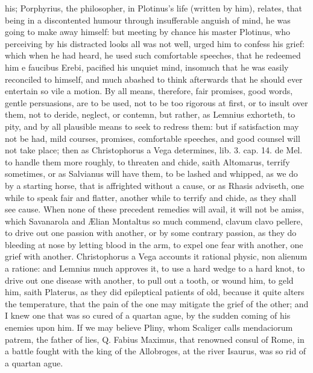 {his; Porphyrius, the philosopher, in Plotinus's life (written by him),
relates, that being in a discontented humour through insufferable
anguish of mind, he was going to make away himself: but meeting by
chance his master Plotinus, who perceiving by his distracted looks all
was not well, urged him to confess his grief: which when he had heard,
he used such comfortable speeches, that he redeemed him e faucibus
Erebi, pacified his unquiet mind, insomuch that he was easily
reconciled to himself, and much abashed to think afterwards that he
should ever entertain so vile a motion. By all means, therefore, fair
promises, good words, gentle persuasions, are to be used, not to be too
rigorous at first, or to insult over them, not to deride,
neglect, or contemn, but rather, as Lemnius exhorteth, to pity, and by
all plausible means to seek to redress them: but if satisfaction may
not be had, mild courses, promises, comfortable speeches, and good
counsel will not take place; then as Christophorus a Vega determines,
lib. 3. cap. 14. de Mel. to handle them more roughly, to threaten and
chide, saith Altomarus, terrify sometimes, or as Salvianus will
have them, to be lashed and whipped, as we do by a starting horse,
that is affrighted without a cause, or as Rhasis adviseth,
one while to speak fair and flatter, another while to terrify and
chide, as they shall see cause.
When none of these precedent remedies will avail, it will not be amiss,
which Savanarola and \AE{}lian Montaltus so much commend, clavum clavo
pellere, to drive out one passion with another, or by some
contrary passion, as they do bleeding at nose by letting blood in the
arm, to expel one fear with another, one grief with another. 
Christophorus a Vega accounts it rational physic, non alienum a
ratione: and Lemnius much approves it, to use a hard wedge to a hard
knot, to drive out one disease with another, to pull out a tooth, or
wound him, to geld him, saith Platerus, as they did epileptical
patients of old, because it quite alters the temperature, that the pain
of the one may mitigate the grief of the other; and I knew one
that was so cured of a quartan ague, by the sudden coming of his
enemies upon him. If we may believe Pliny, whom Scaliger calls
mendaciorum patrem, the father of lies, Q. Fabius Maximus, that
renowned consul of Rome, in a battle fought with the king of the
Allobroges, at the river Isaurus, was so rid of a quartan ague.
}
